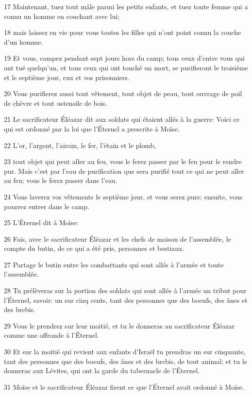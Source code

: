 \par 17 Maintenant, tuez tout mâle parmi les petits enfants, et tuez toute femme qui a connu un homme en couchant avec lui;
\par 18 mais laissez en vie pour vous toutes les filles qui n'ont point connu la couche d'un homme.
\par 19 Et vous, campez pendant sept jours hors du camp; tous ceux d'entre vous qui ont tué quelqu'un, et tous ceux qui ont touché un mort, se purifieront le troisième et le septième jour, eux et vos prisonniers.
\par 20 Vous purifierez aussi tout vêtement, tout objet de peau, tout ouvrage de poil de chèvre et tout ustensile de bois.
\par 21 Le sacrificateur Éléazar dit aux soldats qui étaient allés à la guerre: Voici ce qui est ordonné par la loi que l'Éternel a prescrite à Moïse.
\par 22 L'or, l'argent, l'airain, le fer, l'étain et le plomb,
\par 23 tout objet qui peut aller au feu, vous le ferez passer par le feu pour le rendre pur. Mais c'est par l'eau de purification que sera purifié tout ce qui ne peut aller au feu; vous le ferez passer dans l'eau.
\par 24 Vous laverez vos vêtements le septième jour, et vous serez purs; ensuite, vous pourrez entrer dans le camp.
\par 25 L'Éternel dit à Moïse:
\par 26 Fais, avec le sacrificateur Éléazar et les chefs de maison de l'assemblée, le compte du butin, de ce qui a été pris, personnes et bestiaux.
\par 27 Partage le butin entre les combattants qui sont allés à l'armée et toute l'assemblée.
\par 28 Tu prélèveras sur la portion des soldats qui sont allés à l'armée un tribut pour l'Éternel, savoir: un sur cinq cents, tant des personnes que des boeufs, des ânes et des brebis.
\par 29 Vous le prendrez sur leur moitié, et tu le donneras au sacrificateur Éléazar comme une offrande à l'Éternel.
\par 30 Et sur la moitié qui revient aux enfants d'Israël tu prendras un sur cinquante, tant des personnes que des boeufs, des ânes et des brebis, de tout animal; et tu le donneras aux Lévites, qui ont la garde du tabernacle de l'Éternel.
\par 31 Moïse et le sacrificateur Éléazar firent ce que l'Éternel avait ordonné à Moïse.
